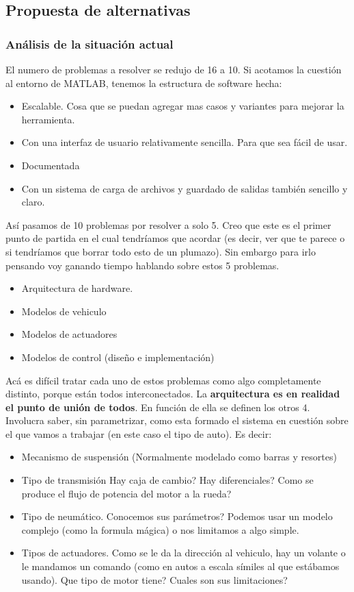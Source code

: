 \documentclass[12pt,a4paper,fleqn]{report}
\begin{document}
\subsection*{Propuesta de alternativas}
\subsubsection*{Análisis de la situación actual}
El numero de problemas a resolver se redujo de 16 a 10. Si acotamos la cuestión al entorno de MATLAB, tenemos la estructura de software hecha:
\begin{itemize}
	\item Escalable. Cosa que se puedan agregar mas casos y variantes para mejorar la herramienta.
	\item Con una interfaz de usuario relativamente sencilla. Para que sea fácil de usar.
	\item Documentada
	\item Con un sistema de carga de archivos y guardado de salidas también sencillo y claro.
\end{itemize}

Así pasamos de 10 problemas por resolver a solo 5. Creo que este es el primer punto de partida en el cual tendríamos que acordar (es decir, ver que te parece o si tendríamos que borrar todo esto de un plumazo). Sin embargo para irlo pensando voy ganando tiempo hablando sobre estos 5 problemas.

\begin{itemize}
	\item Arquitectura de hardware.
	\item Modelos de vehiculo
	\item Modelos de actuadores
	\item Modelos de control (diseño e implementación) 
\end{itemize}

Acá es difícil tratar cada uno de estos problemas como algo completamente distinto, porque están todos interconectados. La \textbf{arquitectura es en realidad el punto de unión de todos}. En función de ella se definen los otros 4. Involucra saber, sin parametrizar, como esta formado el sistema en cuestión sobre el que vamos a trabajar (en este caso el tipo de auto). Es decir:
\begin{itemize}
	\item Mecanismo de suspensión (Normalmente modelado como barras y resortes)
	\item Tipo de transmisión Hay caja de cambio? Hay diferenciales? Como se produce el flujo de potencia del motor a la rueda?
	\item Tipo de neumático. Conocemos sus parámetros? Podemos usar un modelo complejo (como la formula mágica) o nos limitamos a algo simple.
	\item Tipos de actuadores. Como se le da la dirección al vehiculo, hay un volante o le mandamos un comando (como en autos a escala símiles al que estábamos usando). Que tipo de motor tiene? Cuales son sus limitaciones?
\end{itemize}
\end{document}
